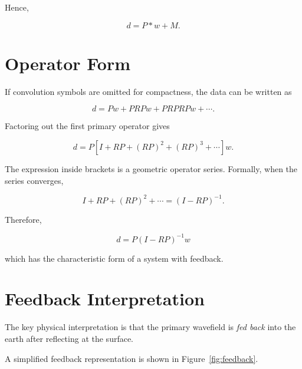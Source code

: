 \documentclass[11pt]{article}
\begin{document}
Hence,

\begin{equation}
d = P*w + M.
\end{equation}

\section{Operator Form}

If convolution symbols are omitted for compactness, the data can be written as

\begin{equation}
d = Pw + PRPw + PRPRPw + \cdots .
\end{equation}

Factoring out the first primary operator gives

\begin{equation}
d =
P
\left[
I + RP + (RP)^2 + (RP)^3 + \cdots
\right]w.
\end{equation}

The expression inside brackets is a geometric operator series. Formally, when
the series converges,

\begin{equation}
I + RP + (RP)^2 + \cdots = (I-RP)^{-1}.
\end{equation}

Therefore,

\begin{equation}
\boxed{
d = P(I-RP)^{-1}w
}
\end{equation}

which has the characteristic form of a system with feedback.

\section{Feedback Interpretation}

The key physical interpretation is that the primary wavefield is
\emph{fed back} into the earth after reflecting at the surface.

A simplified feedback representation is shown in Figure~\ref{fig:feedback}.
\end{document}
